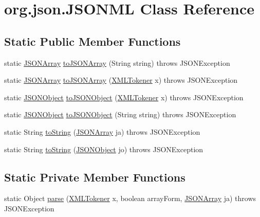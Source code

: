 \hypertarget{classorg_1_1json_1_1_j_s_o_n_m_l}{\section{org.\-json.\-J\-S\-O\-N\-M\-L Class Reference}
\label{classorg_1_1json_1_1_j_s_o_n_m_l}
}
\subsection*{Static Public Member Functions}
\begin{DoxyCompactItemize}
\item 
static \hyperlink{classorg_1_1json_1_1_j_s_o_n_array}{J\-S\-O\-N\-Array} \hyperlink{classorg_1_1json_1_1_j_s_o_n_m_l_a97e622e1f610e21ba5cbd3167d4fb5a1}{to\-J\-S\-O\-N\-Array} (String string)  throws J\-S\-O\-N\-Exception 
\item 
static \hyperlink{classorg_1_1json_1_1_j_s_o_n_array}{J\-S\-O\-N\-Array} \hyperlink{classorg_1_1json_1_1_j_s_o_n_m_l_a82cc8221f4feee054e12a5689a2186f4}{to\-J\-S\-O\-N\-Array} (\hyperlink{classorg_1_1json_1_1_x_m_l_tokener}{X\-M\-L\-Tokener} x)  throws J\-S\-O\-N\-Exception 
\item 
static \hyperlink{classorg_1_1json_1_1_j_s_o_n_object}{J\-S\-O\-N\-Object} \hyperlink{classorg_1_1json_1_1_j_s_o_n_m_l_a9075449699e2ebca8721a6bdf04ee35f}{to\-J\-S\-O\-N\-Object} (\hyperlink{classorg_1_1json_1_1_x_m_l_tokener}{X\-M\-L\-Tokener} x)  throws J\-S\-O\-N\-Exception 
\item 
static \hyperlink{classorg_1_1json_1_1_j_s_o_n_object}{J\-S\-O\-N\-Object} \hyperlink{classorg_1_1json_1_1_j_s_o_n_m_l_aa517a2c5f1930ae22619425098e55f41}{to\-J\-S\-O\-N\-Object} (String string)  throws J\-S\-O\-N\-Exception 
\item 
static String \hyperlink{classorg_1_1json_1_1_j_s_o_n_m_l_aeb4921c45210936fbcd3a527e1df88fd}{to\-String} (\hyperlink{classorg_1_1json_1_1_j_s_o_n_array}{J\-S\-O\-N\-Array} ja)  throws J\-S\-O\-N\-Exception 
\item 
static String \hyperlink{classorg_1_1json_1_1_j_s_o_n_m_l_aa436f0b8577f68314e12f23f803437c2}{to\-String} (\hyperlink{classorg_1_1json_1_1_j_s_o_n_object}{J\-S\-O\-N\-Object} jo)  throws J\-S\-O\-N\-Exception 
\end{DoxyCompactItemize}
\subsection*{Static Private Member Functions}
\begin{DoxyCompactItemize}
\item 
static Object \hyperlink{classorg_1_1json_1_1_j_s_o_n_m_l_a3c36aa36d0d65f7d3f5aef426750faec}{parse} (\hyperlink{classorg_1_1json_1_1_x_m_l_tokener}{X\-M\-L\-Tokener} x, boolean array\-Form, \hyperlink{classorg_1_1json_1_1_j_s_o_n_array}{J\-S\-O\-N\-Array} ja)  throws J\-S\-O\-N\-Exception 
\end{DoxyCompactItemize}



